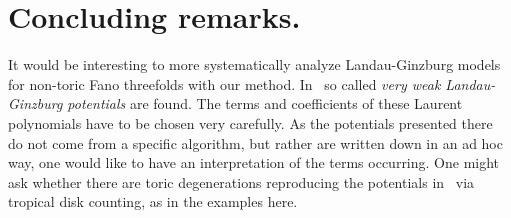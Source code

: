 \documentclass[11pt,letter]{amsart}
\theoremstyle{definition}
\theoremstyle{remark}
\numberwithin{equation}{section}
\numberwithin{figure}{section}
\begin{document}
\section*{Concluding remarks.}
It would be interesting to more systematically analyze Landau-Ginzburg models
for non-toric Fano threefolds with our method. In~\cite{Pr1, Pr2} so called
\emph{very weak Landau-Ginzburg potentials} are found. The terms and
coefficients of these Laurent polynomials have to be chosen very carefully. As
the potentials presented there do not come from a specific algorithm, but rather
are written down in an ad hoc way, one would like to have an interpretation of
the terms occurring. One might ask whether there are toric degenerations
reproducing the potentials in~\cite{Pr1, Pr2} via tropical disk counting, as in
the examples here.



\end{document}
